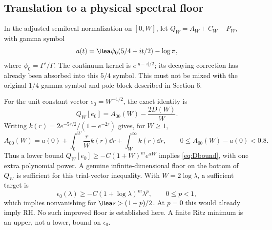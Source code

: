 \subsection{Translation to a physical spectral floor}
In the adjusted semilocal normalization on $[0,W]$, let $Q_W=A_W+C_W-P_W$, with gamma symbol
\[
a(t)=\Rea\psi_0(5/4+it/2)-\log\pi,
\]
where $\psi_0=\Gamma'/\Gamma$. The continuum kernel is $e^{|y-z|/2}$; its decaying correction has already been absorbed into this $5/4$ symbol. This must not be mixed with the original $1/4$ gamma symbol and pole block described in Section 6.

For the unit constant vector $e_0=W^{-1/2}$, the exact identity is
\begin{equation}\label{eq:constant}
Q_W[e_0]=A_{00}(W)-\frac{2D(W)}W.
\end{equation}
Writing $k(r)=2e^{-5r/2}/(1-e^{-2r})$ gives, for $W\ge1$,
\[
A_{00}(W)=a(0)+\int_0^W\frac rW k(r)\dd r+\int_W^\infty k(r)\dd r,
\qquad 0\le A_{00}(W)-a(0)<0.8.
\]
Thus a lower bound $Q_W[e_0]\ge-C(1+W)^me^{\alpha W}$ implies \eqref{eq:Dbound}, with one extra polynomial power. A genuine infinite-dimensional floor on the bottom of $Q_W$ is sufficient for this trial-vector inequality. With $W=2\log\lambda$, a sufficient target is
\begin{equation}\label{eq:floor}
\epsilon_0(\lambda)\ge-C(1+\log\lambda)^m\lambda^p,\qquad0\le p<1,
\end{equation}
which implies nonvanishing for $\Rea s>(1+p)/2$. At $p=0$ this would already imply RH. No such improved floor is established here. A finite Ritz minimum is an upper, not a lower, bound on $\epsilon_0$.
